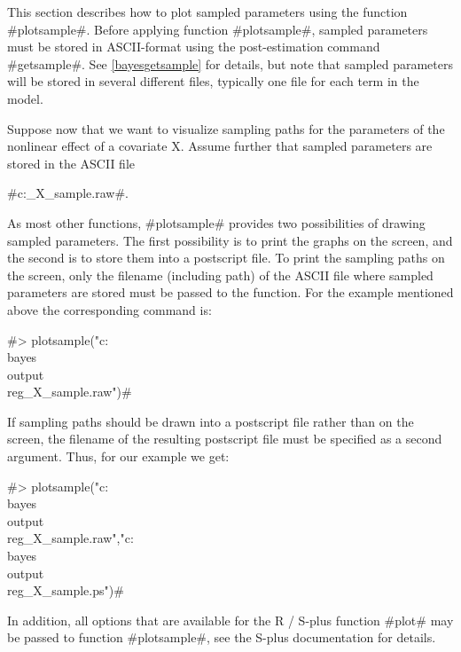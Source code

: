 This section describes how to plot sampled parameters using the
function #plotsample#. Before applying function #plotsample#,
sampled parameters must be stored in ASCII-format using the
post-estimation command #getsample#. See \autoref{bayesgetsample}
for details, but note that sampled parameters will be stored in
several different files, typically one file for each term in the
model.

Suppose now that we want to visualize sampling paths for the
parameters of the nonlinear effect of a covariate X. Assume
further that sampled parameters are stored in the ASCII file

#c:\bayes\output\reg_X_sample.raw#.

As most other functions, #plotsample# provides two possibilities
of drawing sampled parameters. The first possibility is to print
the graphs on the screen, and the second is to store them into a
postscript file. To print the sampling paths on the screen, only
the filename (including path) of the ASCII file where sampled
parameters are stored must be passed to the function. For the
example mentioned above the corresponding command is:

#> plotsample("c:\\bayes\\output\\reg_X_sample.raw")#

If sampling paths should be drawn into a postscript file rather
than on the screen, the filename of the resulting postscript file
must be specified as a second argument. Thus, for our example we
get:

 #> plotsample("c:\\bayes\\output\\reg_X_sample.raw","c:\\bayes\\output\\reg_X_sample.ps")#

In addition, all options that are available for the R / S-plus
function #plot# may be passed to function #plotsample#, see the
S-plus documentation for details.
